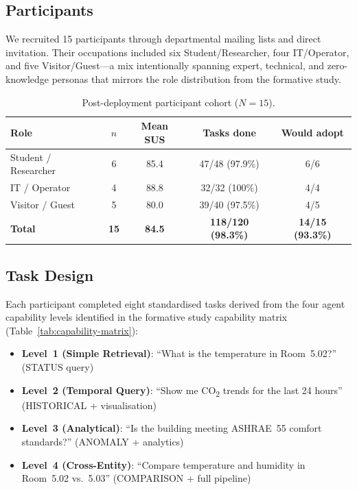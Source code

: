 \documentclass[acmsmall]{acmart}
\begin{document}
\subsection{Participants}

We recruited 15 participants through departmental mailing lists and direct invitation. Their occupations included six Student/Researcher, four IT/Operator, and five Visitor/Guest---a mix intentionally spanning expert, technical, and zero-knowledge personas that mirrors the role distribution from the formative study.

\begin{table}[t]
\centering
\caption{Post-deployment participant cohort ($N=15$).}
\label{tab:participant-demographics}
\small
\begin{tabular}{@{}lcccc@{}}
\toprule
\textbf{Role} & \textbf{$n$} & \textbf{Mean SUS} & \textbf{Tasks done} & \textbf{Would adopt} \\
\midrule
Student / Researcher & 6 & 85.4 & 47/48 (97.9\%) & 6/6 \\
IT / Operator        & 4 & 88.8 & 32/32 (100\%)  & 4/4 \\
Visitor / Guest      & 5 & 80.0 & 39/40 (97.5\%) & 4/5 \\
\midrule
\textbf{Total} & \textbf{15} & \textbf{84.5} & \textbf{118/120 (98.3\%)} & \textbf{14/15 (93.3\%)} \\
\bottomrule
\end{tabular}
\end{table}

\subsection{Task Design}

Each participant completed eight standardised tasks derived from the four agent capability levels identified in the formative study capability matrix (Table~\ref{tab:capability-matrix}):

\begin{itemize}
    \item \textbf{Level~1 (Simple Retrieval)}: ``What is the temperature in Room~5.02?'' (STATUS query)
    \item \textbf{Level~2 (Temporal Query)}: ``Show me CO\textsubscript{2} trends for the last 24 hours'' (HISTORICAL + visualisation)
    \item \textbf{Level~3 (Analytical)}: ``Is the building meeting ASHRAE~55 comfort standards?'' (ANOMALY + analytics)
    \item \textbf{Level~4 (Cross-Entity)}: ``Compare temperature and humidity in Room~5.02 vs.\ 5.03'' (COMPARISON + full pipeline)
\end{itemize}
\end{document}
